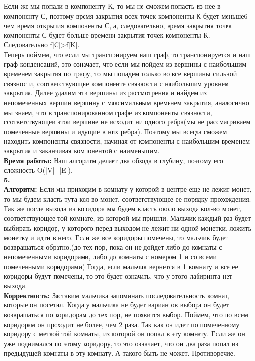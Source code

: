 \documentclass[a4paper,12pt]{article}
\begin{document}
Если же мы попали в компоненту K, то мы не сможем попасть из нее в компоненту С, поэтому время закрытия всех точек компоненты К будет меньше6 чем время открытия компоненты С, а, следовательно, время закрытия точек компоненты С будет больше времени закрытия точек компоненты К. Следовательно f[C]>f[K].\\
Теперь поймем, что  если мы транспонируем наш граф, то транспонируется и наш граф конденсаций, это означает, что если мы пойдем из вершины с наибольшим временем закрытия по графу, то мы попадем только во все вершины сильной связности, соответствующие компоненте связности с наибольшим уровнем закрытия. Далее удалим эти вершины из рассмотрения и найдем из непомеченных вершин вершину с максимальным временем закрытия, аналогично мы знаем, что в транспонированном графе из компоненты связности, ссответствующей этой вершине не исходит ни одного ребра(мы не рассматриваем помеченные вершины и идущие в них ребра). Поэтому мы всегда сможем находить компоненты связности, начиная от компоненты с наибольшим временем закрытия и заканчивая компонентой с наименьшим.\\
\textbf{Время работы:} Наш алгоритм делает два обхода в глубину, поэтому его сложность O(|V|+|E|).\\
\textbf{5.}\\
\textbf{Алгоритм:} Если мы приходим в комнату у которой в центре еще не лежит монет, то мы будем класть тута кол-во монет, соответствующее ее порядку прохождения. Так же после выхода из коридора мы будем класть около выхода кол-во монет, соответствующее той комнате, из которой мы пришли. Мальчик каждый раз будет выбирать коридор, у которого перед выходом не лежит ни одной монетки, ложить монетку и идти в него. Если же все коридоры помечены, то мальчик будет возвращаться обратно.(до тех пор, пока он не дойдет либо до комнаты с непомеченными коридорами, либо до комнаты с номером 1 и со всеми помеченными коридорами) Тогда, если мальчик вернется в 1 комнату и все ее коридоры будут помечены, то это будет означать, что у этого лабиринта нет выхода.\\
\textbf{Корректность:} Заставим мальчика запоминать последовательность комнат, которые он посетил. Когда у мальчика не будет вариантов выбора он будет возвращаться по коридорам до тех пор, не появится выбор. Поймем, что по всем коридорам он проходит не более, чем 2 раза. Так как он идет по помеченному коридору с меткой той комнаты, из которой он попал в эту комнату. Если же он уже поднимался по этому коридору, то это означает, что он два раза попал из предыдущей комнаты в эту комнату. А такого быть не может. Противоречие.\\
\end{document}
